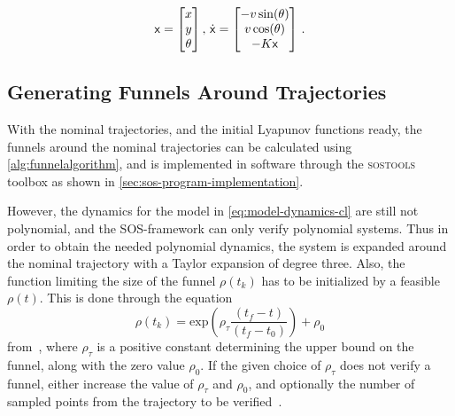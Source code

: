 \begin{equation}
  \label{eq:model-dynamics-cl}
  {\mathbf{\mathsf{x}}} =
  \begin{bmatrix}
    x \\ y \\ \theta \\
  \end{bmatrix}, \, \dot{{\mathbf{\mathsf{x}}}} =
  \begin{bmatrix}
    -v \sin(\theta) \\
    v \cos(\theta) \\
    -K{\mathbf{\mathsf{x}}} \\
  \end{bmatrix} \, .
\end{equation}

\subsection{Generating Funnels Around Trajectories}
\label{subsec:generating-funnels}

With the nominal trajectories, and the initial Lyapunov functions ready, the
funnels around the nominal trajectories can be calculated using
\cref{alg:funnelalgorithm}, and is implemented in software through the
\textsc{sostools}~\cite{sostools} toolbox as shown in
\vref{sec:sos-program-implementation}.

However, the dynamics for the model in \cref{eq:model-dynamics-cl} are still not
polynomial, and the \ac{SOS}-framework can only verify polynomial systems. Thus
in order to obtain the needed polynomial dynamics, the system is expanded around
the nominal trajectory with a Taylor expansion of degree three. Also, the
function limiting the size of the funnel \(\rho(t_{k})\) has to be initialized
by a feasible \(\rho(t)\). This is done through the equation
\begin{equation}
  \rho(t_{k}) = \mathrm{exp}\left( \rho_{\tau}\frac{\left( t_{f} - t \right)}{\left( t_{f} - t_{0}  \right)}\right) + \rho_0
\end{equation}
from~\cite[eq.~6][sec.~3]{Tobenkin_2011}, where \(\rho_{\tau}\) is a positive
constant determining the upper bound on the funnel, along with the zero value
\(\rho_0\). If the given choice of \(\rho_{\tau}\) does not verify a funnel,
either increase the value of \(\rho_{\tau}\) and \(\rho_0\), and optionally the
number of sampled points from the trajectory to be
verified~\cite{Tobenkin_2011}.

